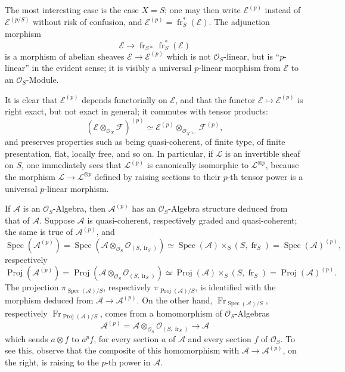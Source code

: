 \documentclass[11pt]{article}
\DeclareMathOperator{\Spec}{Spec}
\providecommand{\OO}{\mathcal{O}}
\providecommand{\cE}{\mathcal E}
\providecommand{\cF}{\mathcal F}
\providecommand{\Spec}{\operatorname{Spec}}
\providecommand{\Spec}{\operatorname{Spec}}
\providecommand{\Spec}{\operatorname{Spec}}
\providecommand{\fr}{\operatorname{fr}}
\providecommand{\Fr}{\operatorname{Fr}}
\providecommand{\Proj}{\operatorname{Proj}}
\providecommand{\cL}{\mathcal L}
\begin{document}
The most interesting case is the case $X=S$; one may then write $\cE^{(p)}$ instead of $\cE^{(p/S)}$ without risk of confusion, and $\cE^{(p)}=\fr_S^*(\cE)$. The adjunction morphism
\[
\cE\longrightarrow \fr_{S*}\fr_S^*(\cE)
\]
is a morphism of abelian sheaves $\cE\to\cE^{(p)}$ which is not $\OO_S$-linear, but is ``$p$-linear'' in the evident sense; it is visibly a universal $p$-linear morphism from $\cE$ to an $\OO_S$-Module.

It is clear that $\cE^{(p)}$ depends functorially on $\cE$, and that the functor $\cE\mapsto\cE^{(p)}$ is right exact, but not exact in general; it commutes with tensor products:
\[
(\cE\otimes_{\OO_X}\cF)^{(p)}\simeq
\cE^{(p)}\otimes_{\OO_{X^{(p)}}}\cF^{(p)},
\]
and preserves properties such as being quasi-coherent, of finite type, of finite presentation, flat, locally free, and so on. In particular, if $\cL$ is an invertible sheaf on $S$, one immediately sees that $\cL^{(p)}$ is canonically isomorphic to $\cL^{\otimes p}$, because the morphism $\cL\to\cL^{\otimes p}$ defined by raising sections to their $p$-th tensor power is a universal $p$-linear morphism.

If $\mathcal{A}$ is an $\OO_S$-Algebra, then $\mathcal{A}^{(p)}$ has an $\OO_S$-Algebra structure deduced from that of $\mathcal{A}$. Suppose $\mathcal{A}$ is quasi-coherent, respectively graded and quasi-coherent; the same is true of $\mathcal{A}^{(p)}$, and
\[
\Spec(\mathcal{A}^{(p)})=\Spec(\mathcal{A}\otimes_{\OO_S}\OO_{(S,\fr_S)})
 \simeq \Spec(\mathcal{A})\times_S(S,\fr_S)=\Spec(\mathcal{A})^{(p)},
\]
respectively
\[
\Proj(\mathcal{A}^{(p)})=\Proj(\mathcal{A}\otimes_{\OO_S}\OO_{(S,\fr_S)})
 \simeq \Proj(\mathcal{A})\times_S(S,\fr_S)=\Proj(\mathcal{A})^{(p)}.
\]
The projection $\pi_{\Spec(\mathcal{A})/S}$, respectively $\pi_{\Proj(\mathcal{A})/S}$, is identified with the morphism deduced from $\mathcal{A}\to\mathcal{A}^{(p)}$. On the other hand, $\Fr_{\Spec(\mathcal{A})/S}$, respectively $\Fr_{\Proj(\mathcal{A})/S}$, comes from a homomorphism of $\OO_S$-Algebras
\[
\mathcal{A}^{(p)}=\mathcal{A}\otimes_{\OO_S}\OO_{(S,\fr_S)}\longrightarrow \mathcal{A}
\]
which sends $a\otimes f$ to $a^p f$, for every section $a$ of $\mathcal{A}$ and every section $f$ of $\OO_S$. To see this, observe that the composite of this homomorphism with $\mathcal{A}\to\mathcal{A}^{(p)}$, on the right, is raising to the $p$-th power in $\mathcal{A}$.
\end{document}
